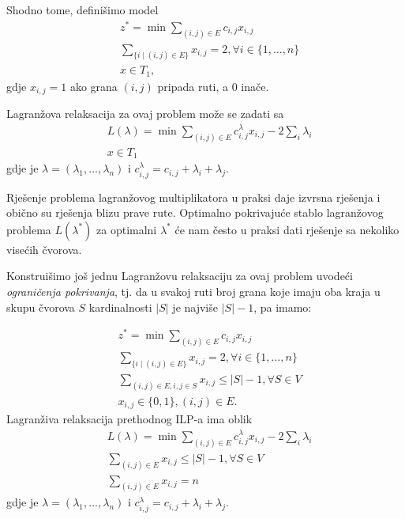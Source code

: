 \documentclass[a4paper, utf8, 11pt, colorlinks]{book}
\begin{document}
Shodno tome, definišimo model
\begin{align*}
    &z^* = \min \sum_{(i,j)\in E} c_{i,j} x_{i,j}\\
    & \sum_{ \{ i \mid (i,j) \in E \} } x_{i,j} = 2, \forall i \in \{1,\ldots, n \} \\
    & x \in T_1,
\end{align*}
gdje $x_{i,j} = 1$ ako grana $(i,j)$ pripada ruti, a 0 inače.

Lagranžova relaksacija za ovaj problem može se zadati sa 
\begin{align*}
     &L(\lambda) = \min \sum_{(i,j)\in E} c^\lambda_{i,j} x_{i,j} - 2 \sum_{i} \lambda_i \\
     & x \in T_1
\end{align*}
gdje je $\lambda=(\lambda_1, \ldots, \lambda_n)$ i $c^\lambda_{i,j} = c_{i,j} + \lambda_i + \lambda_j$. 

Rješenje problema lagranžovog multiplikatora u praksi daje izvrsna rješenja i obično su rješenja blizu prave rute. Optimalno pokrivajuće stablo lagranžovog problema $L(\lambda^*)$ za optimalni $\lambda^*$ će nam često u praksi dati rješenje sa  nekoliko visećih čvorova. 

Konstruišimo još jednu Lagranžovu relaksaciju za ovaj problem uvodeći \emph{ograničenja pokrivanja}, tj. da u svakoj ruti broj grana koje imaju oba kraja u skupu čvorova $S$ kardinalnosti $|S|$ je najviše $|S|-1$, pa imamo: 

\begin{align*}
     & z^* = \min \sum_{(i,j)\in E} c_{i,j} x_{i,j} \\
     & \sum_{ \{ i \mid (i,j) \in E \} } x_{i,j} = 2, \forall i \in \{1,\ldots, n \} \\
     & \sum_{(i,j) \in E, i,j \in S} x_{i,j} \leq |S|-1, \forall S \in V \\
     & x_{i,j} \in \{0, 1 \}, (i,j)\in E.
\end{align*}
Lagranživa relaksacija prethodnog ILP-a ima oblik 
\begin{align*}
 &L(\lambda) = \min \sum_{(i,j)\in E} c^\lambda_{i,j} x_{i,j} - 2 \sum_{i} \lambda_i \\
 & \sum_{(i,j) \in E} x_{i,j} \leq |S|-1, \forall S \in V \\
 & \sum_{(i,j) \in E} x_{i,j} = n
\end{align*}
gdje je $\lambda=(\lambda_1, \ldots, \lambda_n)$ i $c^\lambda_{i,j} = c_{i,j} + \lambda_i + \lambda_j$. 

\end{document}
